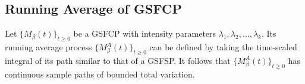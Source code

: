 \documentclass[11pt,oneside,reqno]{amsart}
\theoremstyle{definition}
\newtheorem{definition}{Definition}[section]
\theoremstyle{remarkstyle}
\begin{document}
\subsection{Running Average of GSFCP}
Let $\{M_{\beta}(t)\}_{t\ge 0}$ be a GSFCP with intensity parameters $\lambda_1,\lambda_2,\ldots,\lambda_k$.
Its running average process $\{M^A_{\beta}(t)\}_{t \geq 0}$ can be defined by taking the time-scaled integral of its path similar to that of a GSFSP. It follows that $\{M^A_{\beta}(t)\}_{t \geq 0}$ has continuous sample paths of bounded total variation.   

\end{document}
